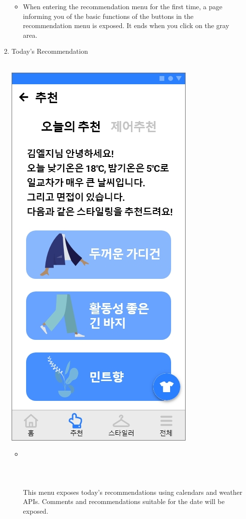 \documentclass[conference]{IEEEtran}
\begin{document}
\begin{enumerate}
        \begin{itemize}
    \item[] When entering the recommendation menu for the first time, a page informing you of the basic functions of the buttons in the recommendation menu is exposed. It ends when you click on the gray area. \\
\end{itemize}
     \item Today's Recommendation \\ \\
     \centerline{\includegraphics[scale=0.32]{assets/추천2.jpg}}
    \begin{itemize}
    \item[] \\ \\ \\ \\ This menu exposes today's recommendations using calendars and weather APIs. Comments and recommendations suitable for the date will be exposed.\\

\end{itemize}
\end{enumerate}
\end{document}
